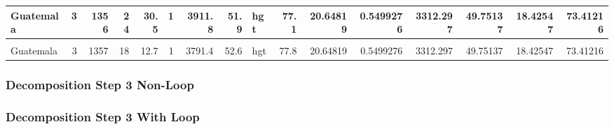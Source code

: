 \documentclass[
]{book}
\newenvironment{Shaded}{\begin{snugshade}}{\end{snugshade}}
\newcommand{\ControlFlowTok}[1]{\textcolor[rgb]{0.13,0.29,0.53}{\textbf{#1}}}
\newcommand{\FunctionTok}[1]{\textcolor[rgb]{0.00,0.00,0.00}{#1}}
\newcommand{\NormalTok}[1]{#1}
\newcommand{\OtherTok}[1]{\textcolor[rgb]{0.56,0.35,0.01}{#1}}
\newcommand{\SpecialCharTok}[1]{\textcolor[rgb]{0.00,0.00,0.00}{#1}}
\newcommand{\StringTok}[1]{\textcolor[rgb]{0.31,0.60,0.02}{#1}}
\begin{document}
\begin{table}[!h]
{\begin{tabular}{l|r|r|r|r|r|r|r|l|r|r|r|r|r|r|r}
\hline
Guatemala & 3 & 1356 & 24 & 30.5 & 1 & 3911.8 & 51.9 & hgt & 77.1 & 20.64819 & 0.5499276 & 3312.297 & 49.75137 & 18.42547 & 73.41216\\
\hline
\cellcolor{gray!6}{Guatemala} & \cellcolor{gray!6}{3} & \cellcolor{gray!6}{1357} & \cellcolor{gray!6}{12} & \cellcolor{gray!6}{1.0} & \cellcolor{gray!6}{1} & \cellcolor{gray!6}{3791.4} & \cellcolor{gray!6}{52.6} & \cellcolor{gray!6}{hgt} & \cellcolor{gray!6}{71.5} & \cellcolor{gray!6}{20.64819} & \cellcolor{gray!6}{0.5499276} & \cellcolor{gray!6}{3312.297} & \cellcolor{gray!6}{49.75137} & \cellcolor{gray!6}{18.42547} & \cellcolor{gray!6}{73.41216}\\
\hline
Guatemala & 3 & 1357 & 18 & 12.7 & 1 & 3791.4 & 52.6 & hgt & 77.8 & 20.64819 & 0.5499276 & 3312.297 & 49.75137 & 18.42547 & 73.41216\\
\hline
\end{tabular}}
\end{table}

\hypertarget{decomposition-step-3-non-loop}{%
\subsubsection{Decomposition Step 3 Non-Loop}\label{decomposition-step-3-non-loop}}

\begin{Shaded}
\end{Shaded}

\hypertarget{decomposition-step-3-with-loop}{%
\subsubsection{Decomposition Step 3 With Loop}\label{decomposition-step-3-with-loop}}
\end{document}
